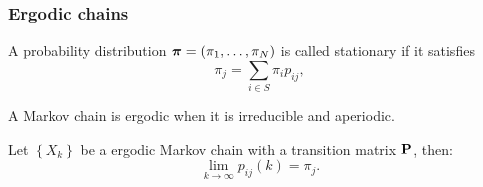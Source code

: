 \begin{frame}
	\frametitle{Ergodic chains}
	\begin{definition}[Stationarity]
		A probability distribution $\boldsymbol{\pi} = (\pi_1, \ldots, \pi_N)$ is called stationary if it satisfies
		\begin{equation*}
		\pi_j = \sum_{i \in S} \pi_i p_{ij},
		\end{equation*}
	\end{definition}
	\begin{definition}[Ergodicity]
		A Markov chain is ergodic when it is irreducible and aperiodic.
	\end{definition}
	\begin{theorem}
		Let $\left\{X_k\right\}$ be a ergodic Markov chain with a transition matrix $\mathbf{P}$, then:
		\begin{equation*}
		\lim_{k \rightarrow \infty} p_{ij}(k) = \pi_j.
		\end{equation*}
	\end{theorem}
\end{frame}